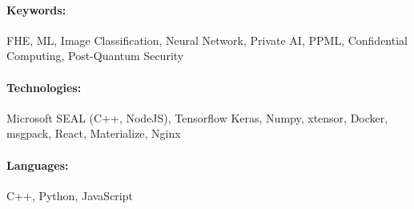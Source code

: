 \paragraph{Keywords:}
FHE, ML, Image Classification, Neural Network,
Private AI, PPML, Confidential Computing,
Post-Quantum Security

\paragraph{Technologies:}
Microsoft SEAL (C++, NodeJS),
Tensorflow Keras,
Numpy,
xtensor,
Docker,
msgpack,
React,
Materialize,
Nginx

\paragraph{Languages:}
C++, Python, JavaScript
